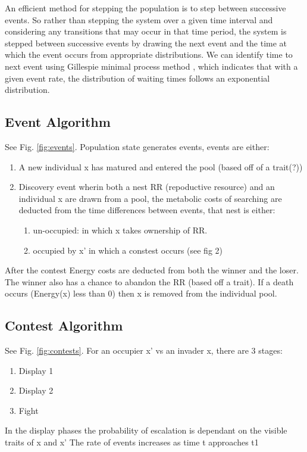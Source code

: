 \documentclass[a4paper,11pt]{article}
\begin{document}
An efficient method for stepping the population is to step between successive events. So rather than stepping the system over a given time interval and considering any transitions that may occur in that time period, the system is stepped between successive events by drawing the next event and the time at which the event occurs from appropriate distributions.  We can identify time to next event using Gillespie minimal process method \citep{Gillespie-1976}, which indicates that with a given event rate, the distribution of waiting times follows an exponential distribution.

\subsection{Event Algorithm}
See Fig. \ref{fig:events}. Population state generates events, events are either:
\begin{enumerate}
    \item A new individual x has matured and entered the pool (based off of a trait(?))
    \item Discovery event wherin both a nest RR (repoductive resource) and an individual x are drawn from a pool, the metabolic costs of searching are deducted from the time differences between events, that nest is either:
    \begin{enumerate}
        \item un-occupied: in which x takes ownership of RR.
        \item occupied by x' in which a constest occurs (see fig 2)
    \end{enumerate}
\end{enumerate}
After the contest Energy costs are deducted from both the winner and the loser.
The winner also has a chance to abandon the RR (based off a trait).
If a death occurs (Energy(x) less than 0) then x is removed from the individual pool.

\subsection{Contest Algorithm}
See Fig. \ref{fig:contests}.
For an occupier x' vs an invader x, there are 3 stages:
\begin{enumerate}
    \item Display 1
    \item Display 2
    \item Fight
\end{enumerate}
In the display phases the probability of escalation is dependant on the visible traits of x and x'
The rate of events increases as time t approaches t1
\end{document}
